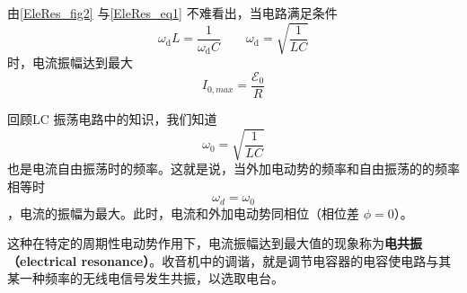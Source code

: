由\autoref{EleRes_fig2} 与\autoref{EleRes_eq1} 不难看出，当电路满足条件
\begin{equation}
\omega_{\mathrm{d}} L=\dfrac{1}{\omega_{\mathrm{d}} C}
\qquad 
\omega_{\mathrm{d}}=\sqrt{\frac{1}{L C}}
\end{equation}
时，电流振幅达到最大
$$I_{0,max}=\dfrac{\mathscr{E}_{0}}{R}$$

回顾LC 振荡电路中的知识，我们知道$$\omega_0 = \sqrt{\frac{1}{LC}}$$也是电流自由振荡时的频率。这就是说，当外加电动势的频率和自由振荡的的频率相等时$$\omega_d=\omega_0$$，电流的振幅为最大。此时，电流和外加电动势同相位（相位差 $\phi=0$）。

这种在特定的周期性电动势作用下，电流振幅达到最大值的现象称为\textbf{电共振（electrical resonance）}。收音机中的调谐，就是调节电容器的电容使电路与其某一种频率的无线电信号发生共振，以选取电台。
